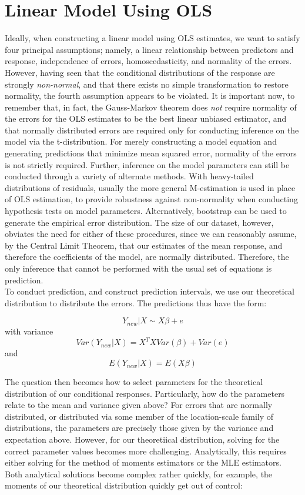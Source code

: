 \documentclass[12pt, a4paper]{book}
\newcommand\tab[1][1cm]{\hspace*{#1}}
\begin{document}
	\section{Linear Model Using OLS}
	\tab Ideally, when constructing a linear model using OLS estimates, we want to satisfy four principal assumptions; namely, a linear relationship between predictors and response, independence of errors, homoscedasticity, and normality of the errors. However, having seen that the conditional distributions of the response are strongly \textit{non-normal}, and that there exists no simple transformation to restore normality, the fourth assumption appears to be violated. It is important now, to remember that, in fact, the Gauss-Markov theorem does \textit{not} require normality of the errors for the OLS estimates to be the best linear unbiased estimator, and that normally distributed errors are required only for conducting inference on the model via the t-distribution. For merely constructing a model equation and generating predictions that minimize mean squared error, normality of the errors is not strictly required. Further, inference on the model parameters can still be conducted through a variety of alternate methods. With heavy-tailed distributions of residuals, usually the more general M-estimation is used in place of OLS estimation, to provide robustness against non-normality when conducting hypothesis tests on model parameters. Alternatively, bootstrap can be used to generate the empirical error distribution. The size of our dataset, however, obviates the need for either of these procedures, since we can reasonably assume, by the Central Limit Theorem, that our estimates of the mean response, and therefore the coefficients of the model, are normally distributed. Therefore, the only inference that cannot be performed with the usual set of equations is prediction. \\
	\tab To conduct prediction, and construct prediction intervals, we use our theoretical distribution to distribute the errors. The predictions thus have the form: \begin{center}
	$$Y_{new}|X\sim X\beta + e$$
	with variance
	$$Var(Y_{new}|X) = X^TXVar(\beta) + Var(e)$$
	and
	$$E(Y_{new}|X) = E(X\beta)$$
	\end{center} 
	\tab The question then becomes how to select parameters for the theoretical distribution of our conditional responses. Particularly, how do the parameters relate to the mean and variance given above?  For errors that are normally distributed, or distributed via some member of the location-scale family of distributions, the parameters are precisely those given by the variance and expectation above. However, for our theoretiical distribution, solving for the correct parameter values becomes more challenging. Analytically, this requires either solving for the method of moments estimators or the MLE estimators. Both analytical solutions become complex rather quickly, for example, the moments of our theoretical distribution quickly get out of control:
\end{document}
